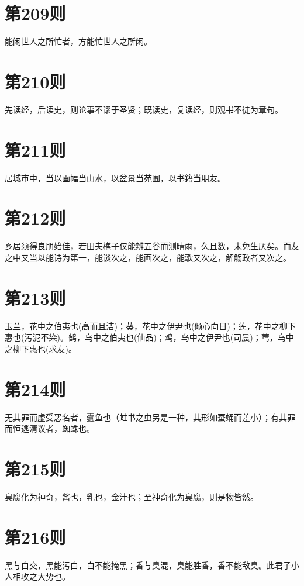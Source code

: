 \documentclass[12pt,a4paper]{ctexbook}
\begin{document}
\section{第209则}
能闲世人之所忙者，方能忙世人之所闲。\par

\section{第210则}
先读经，后读史，则论事不谬于圣贤；既读史，复读经，则观书不徒为章句。\par

\section{第211则}
居城市中，当以画幅当山水，以盆景当苑囿，以书籍当朋友。\par

\section{第212则}
乡居须得良朋始佳，若田夫樵子仅能辨五谷而测晴雨，久且数，未免生厌矣。而友之中又当以能诗为第一，能谈次之，能画次之，能歌又次之，解觞政者又次之。\par

\section{第213则}
玉兰，花中之伯夷也(高而且洁)；葵，花中之伊尹也(倾心向日)；莲，花中之柳下惠也(污泥不染)。鹤，鸟中之伯夷也(仙品)；鸡，鸟中之伊尹也(司晨)；莺，鸟中之柳下惠也(求友)。\par

\section{第214则}
无其罪而虚受恶名者，蠹鱼也（蛀书之虫另是一种，其形如蚕蛹而差小）；有其罪而恒逃清议者，蜘蛛也。\par

\section{第215则}
臭腐化为神奇，酱也，乳也，金汁也；至神奇化为臭腐，则是物皆然。\par

\section{第216则}
黑与白交，黑能污白，白不能掩黑；香与臭混，臭能胜香，香不能敌臭。此君子小人相攻之大势也。\par
\end{document}
